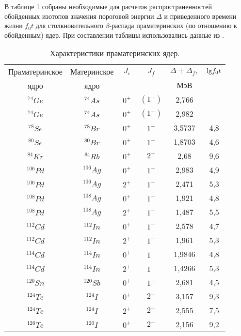 В таблице 1 собраны необходимые для расчетов распространенностей обойденных
изотопов значения пороговой энергии $\Delta$ и приведенного
времени жизни $f_0 t$ для столкновительного $\beta$-распада праматеринских
(по отношению к обойденным) ядер. При составлении таблицы использовались
данные из \cite{isotopes}.


\noindent
\begin{table}
\caption{Характеристики праматеринских ядер.}
\tabcolsep=5pt
\begin{tabular}{|c|c|c|c|c|c|}
\hline
 Праматеринское& Материнское & $\; J_i\; $&$J_f$&$\Delta + \Delta_f,$&${\rm lg} f_0t$\\
  ядро  &   ядро &&&$МэВ$&\\
 \hline
  $^{74}Ge$ & $^{74}As$ & $0^+$  &  $(1^+)$ & 2,766 &      \\
  $^{74}Ge$ & $^{74}As$ & $0^+$  &  $(1^+)$ & 2,982 &      \\
  $^{78}Se$ & $^{78}Br$ & $0^+$  &  $1^+$  & 3,5737 &   4,8   \\
  $^{80}Se$ & $^{80}Br$ & $0^+$  &  $1^+$  & 1,8703 &   4,6  \\
  $^{84}Kr$ & $^{84}Rb$ & $0^+$  &  $2^-$  & 2,68   &   9,6  \\
  $^{106}Pd$ & $^{106}Ag$ & $0^+$  &  $1^+$  & 2,983 &   4,9   \\
  $^{106}Pd$ & $^{106}Ag$ & $2^+$  &  $1^+$  & 2,471 &   5,3   \\
  $^{108}Pd$ & $^{108}Ag$ & $0^+$  &  $1^+$  & 1,921 &   4,8   \\
  $^{108}Pd$ & $^{108}Ag$ & $2^+$  &  $1^+$  & 1,487 &   5,5   \\
  $^{112}Cd$ & $^{112}In$ & $0^+$  &  $1^+$  & 2,578 &   4,7   \\
  $^{112}Cd$ & $^{112}In$ & $2^+$  &  $1^+$  & 1,961 &   5,3   \\
  $^{114}Cd$ & $^{114}In$ & $0^+$  &  $1^+$  & 1,9846 &   4,8   \\
  $^{114}Cd$ & $^{114}In$ & $2^+$  &  $1^+$  & 1,4266 &   5,3   \\
  $^{120}Sn$ & $^{120}Sb$ & $0^+$  &  $1^+$  & 2,681 &   4,5   \\
  $^{124}Te$ & $^{124}I$  & $0^+$  &  $2^-$  & 3,157 &   9,3   \\
  $^{124}Te$ & $^{124}I$  & $2^+$  &  $2^-$  & 2,555 &   7,5   \\
  $^{126}Te$ & $^{126}I$  & $0^+$  &  $2^-$  & 2,156 &   9,2   \\

\end{tabular}
\end{table}
